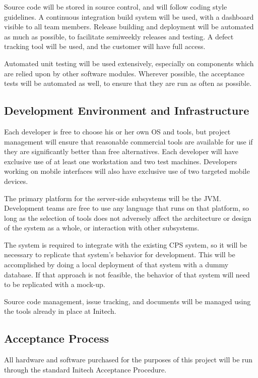 \documentclass[11pt]{article}
\begin{document}
Source code will be stored in source control, and will follow coding style guidelines.  A continuous
integration build system will be used, with a dashboard visible to all team members.  Release
building and deployment will be automated as much as possible, to facilitate semiweekly releases and
testing.  A defect tracking tool will be used, and the customer will have full access.

Automated unit testing will be used extensively, especially on components which are relied upon by
other software modules.  Wherever possible, the acceptance tests will be automated as well, to
ensure that they are run as often as possible.



\subsection{Development Environment and Infrastructure}
Each developer is free to choose his or her own OS and tools, but project management will ensure
that reasonable commercial tools are available for use if they are significantly better than free
alternatives.  Each developer will have exclusive use of at least one workstation and two test
machines.  Developers working on mobile interfaces will also have exclusive use of two targeted
mobile devices.

The primary platform for the server-side subsystems will be the JVM.  Development teams are free to
use any language that runs on that platform, so long as the selection of tools does not adversely
affect the architecture or design of the system as a whole, or interaction with other subsystems.

The system is required to integrate with the existing CPS system, so it will be necessary to
replicate that system's behavior for development.  This will be accomplished by doing a local
deployment of that system with a dummy database.  If that approach is not feasible, the behavior of
that system will need to be replicated with a mock-up.

Source code management, issue tracking, and documents will be managed using the tools already in
place at Initech.


\subsection{Acceptance Process}
All hardware and software purchased for the purposes of this project will be run through the
standard Initech Acceptance Procedure.
\end{document}
